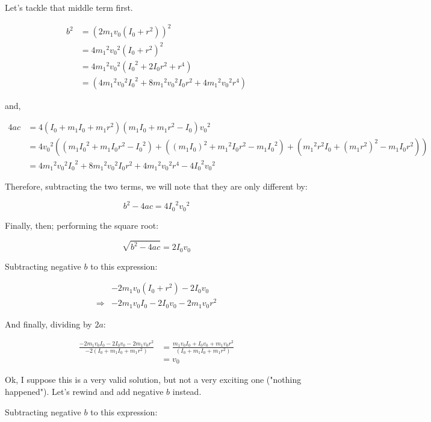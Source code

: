 \documentclass[letterpaper]{article}
\begin{document}
Let's tackle that middle term first.

\begin{align}
   b^2 &=  (2m_1v_0(I_0+r^2))^2\\
&= 4{m_1}^2{v_0}^2(I_0+r^2)^2\\
&= 4{m_1}^2{v_0}^2({I_0}^2+2I_0r^2+r^4)\\
&= (4{m_1}^2{v_0}^2{I_0}^2+8{m_1}^2{v_0}^2I_0r^2+4{m_1}^2{v_0}^2r^4)
\end{align}

and,

\begin{align}
   4ac &=  4(I_0+m_1I_0+m_1r^2)(m_1I_0+m_1r^2-I_0){v_0}^2\\
&= 4{v_0}^2((m_1{I_0}^2+m_1I_0r^2-{I_0}^2)+((m_1I_0)^2+{m_1}^2I_0r^2-m_1{I_0}^2)+({m_1}^2r^2I_0+(m_1r^2)^2-m_1I_0r^2))\\
&= 4{m_1}^2{v_0}^2{I_0}^2+8{m_1}^2{v_0}^2I_0r^2+4{m_1}^2{v_0}^2r^4 - 4{I_0}^2{v_0}^2
\end{align}

Therefore, subtracting the two terms, we will note that they are only different by:

\begin{equation}
   b^2-4ac = 4{I_0}^2{v_0}^2
\end{equation}

Finally, then; performing the square root:

\begin{equation}
    \sqrt{b^2-4ac}  = 2{I_0}{v_0}
\end{equation}

Subtracting negative \(b\) to this expression:

\begin{align}
   &-2m_1v_0(I_0+r^2) - 2{I_0}{v_0}\\
\Rightarrow &-2m_1v_0I_0- 2{I_0}{v_0}-2m_1v_0r^2 
\end{align}

And finally, dividing by \(2a\):

\begin{align}
   \frac{-2m_1v_0I_0- 2{I_0}{v_0}-2m_1v_0r^2}{-2(I_0+m_1I_0+m_1r^2)} &=\frac{m_1v_0I_0+{I_0}{v_0}+m_1v_0r^2}{(I_0+m_1I_0+m_1r^2)}\\
&= v_0
\end{align}

Ok, I suppose this is a very valid solution, but not a very exciting one ("nothing happened"). Let's rewind and add negative \(b\) instead.

Subtracting negative \(b\) to this expression:
\end{document}
